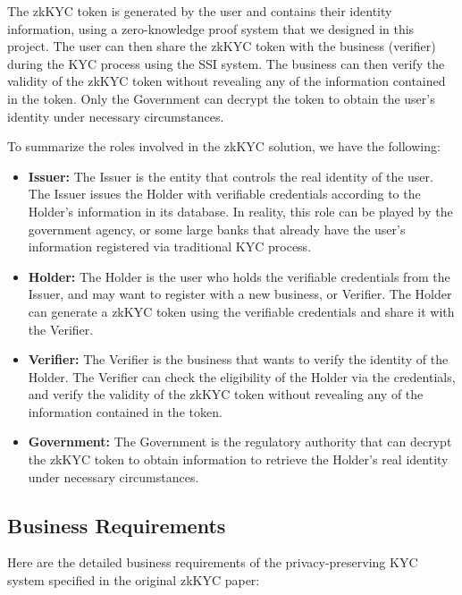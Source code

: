 \documentclass[
]{report}
\providecommand{\tightlist}{%
  \setlength{\itemsep}{0pt}\setlength{\parskip}{0pt}}
\begin{document}
The zkKYC token is generated by the user and contains their identity
information, using a zero-knowledge proof system that we designed in
this project. The user can then share the zkKYC token with the business
(verifier) during the KYC process using the SSI system. The business can
then verify the validity of the zkKYC token without revealing any of the
information contained in the token. Only the Government can decrypt the
token to obtain the user's identity under necessary circumstances.

To summarize the roles involved in the zkKYC solution, we have the
following:
\begin{itemize}
\tightlist
\item
\textbf{Issuer:} The Issuer is the entity that controls the real
identity of the user. The Issuer issues the Holder with verifiable 
credentials according to the Holder's information in its database.
In reality, this role can be played by the government agency, or some
large banks that already have the user's information registered via
traditional KYC process.

\item
\textbf{Holder:} The Holder is the user who holds the verifiable
credentials from the Issuer, and may want to register with a new
business, or Verifier. The Holder can generate a zkKYC token using the
verifiable credentials and share it with the Verifier.

\item
\textbf{Verifier:} The Verifier is the business that wants to verify
the identity of the Holder. The Verifier can check the eligibility
of the Holder via the credentials, and verify the validity of the
zkKYC token without revealing any of the information contained in the
token.

\item
\textbf{Government:} The Government is the regulatory authority that
can decrypt the zkKYC token to obtain information to retrieve the
Holder's real identity under necessary circumstances.
\end{itemize}

\subsection*{Business Requirements}

Here are the detailed business requirements of the privacy-preserving KYC
system specified in the original zkKYC paper:
\end{document}
